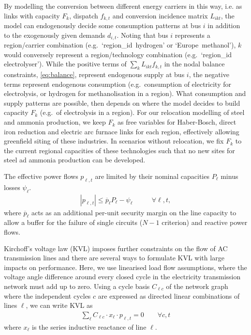 By modelling the conversion between different energy carriers in this way, i.e.
as links with capacity $F_k$, dispatch $f_{k,t}$ and conversion incidence matrix
$L_{ikt}$, the model can endogenously decide some consumption patterns at bus
$i$ in addition to the exogenously given demands $d_{i,t}$. Noting that bus $i$
represents a region/carrier combination (e.g.~`region\_id~hydrogen' or
`Europe~methanol'), $k$ would conversely represent a region/technology combination
(e.g.~`region\_id electrolyser'). While the positive terms of $\sum_k L_{ikt}
f_{k,t}$ in the nodal balance constraints, \cref{eq:balance}, represent
endogenous supply at bus $i$, the negative terms represent endogenous
consumption (e.g.~consumption of electricity for electrolysis, or hydrogen for
methanolisation in a region). What consumption and supply patterns are possible,
then depends on where the model decides to build capacity $F_k$ (e.g.~of
electrolysis in a region). For our relocation modelling of steel and ammonia
production, we keep $F_k$ as free variables for Haber-Bosch, direct iron
reduction and electric arc furnace links for each region, effectively allowing
greenfield siting of these industries. In scenarios without relocation, we fix
$F_k$ to the current regional capacities of these technologies such that no new
sites for steel ad ammonia production can be developed.


The effective power flows $p_{\ell,t}$ are limited by their nominal capacities $P_\ell$ minus losses $\psi_\ell$.
\begin{align}
	|p_{\ell,t}| \leq \overline{p}_{\ell} P_{\ell} - \psi_\ell & \qquad\forall \ell, t,
	\label{eq:cap}
\end{align}
where $\overline{p}_\ell$ acts as an additional per-unit security margin on the line capacity
to allow a buffer for the failure of single circuits ($N-1$ criterion) and reactive power flows.

Kirchoff's voltage law (KVL) imposes further constraints on the flow of AC
transmission lines and there are several ways to formulate KVL with large
impacts on performance. Here, we use linearised load flow assumptions, where the
voltage angle difference around every closed cycle in the electricity
transmission network must add up to zero. Using a cycle basis $C_{\ell c}$ of
the network graph where the independent cycles $c$ are expressed as directed
linear combinations of lines $\ell$, we can write
KVL as
\begin{align}
    \sum_\ell C_{\ell c} \cdot x_\ell \cdot p_{\ell,t} = 0 \qquad\forall c,t
    \label{eq:kvl}
\end{align}
where $x_\ell$ is the series inductive reactance of line $\ell$.

